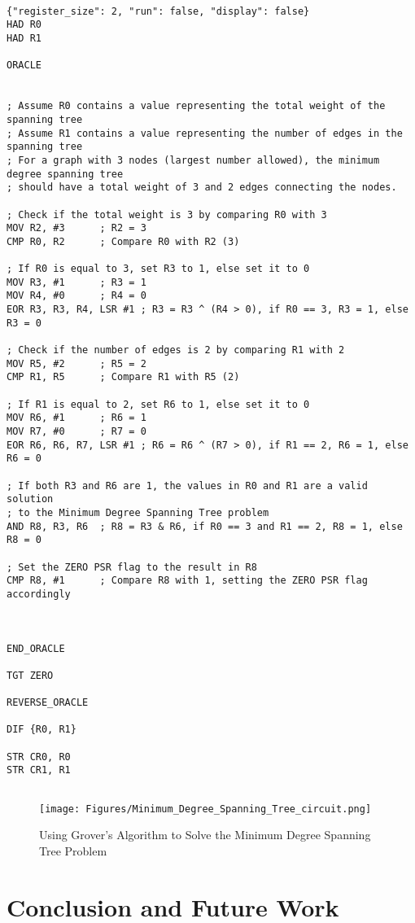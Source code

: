 \begin{lstlisting}

{"register_size": 2, "run": false, "display": false}
HAD R0
HAD R1

ORACLE


; Assume R0 contains a value representing the total weight of the spanning tree
; Assume R1 contains a value representing the number of edges in the spanning tree
; For a graph with 3 nodes (largest number allowed), the minimum degree spanning tree
; should have a total weight of 3 and 2 edges connecting the nodes.

; Check if the total weight is 3 by comparing R0 with 3
MOV R2, #3      ; R2 = 3
CMP R0, R2      ; Compare R0 with R2 (3)

; If R0 is equal to 3, set R3 to 1, else set it to 0
MOV R3, #1      ; R3 = 1
MOV R4, #0      ; R4 = 0
EOR R3, R3, R4, LSR #1 ; R3 = R3 ^ (R4 > 0), if R0 == 3, R3 = 1, else R3 = 0

; Check if the number of edges is 2 by comparing R1 with 2
MOV R5, #2      ; R5 = 2
CMP R1, R5      ; Compare R1 with R5 (2)

; If R1 is equal to 2, set R6 to 1, else set it to 0
MOV R6, #1      ; R6 = 1
MOV R7, #0      ; R7 = 0
EOR R6, R6, R7, LSR #1 ; R6 = R6 ^ (R7 > 0), if R1 == 2, R6 = 1, else R6 = 0

; If both R3 and R6 are 1, the values in R0 and R1 are a valid solution
; to the Minimum Degree Spanning Tree problem
AND R8, R3, R6  ; R8 = R3 & R6, if R0 == 3 and R1 == 2, R8 = 1, else R8 = 0

; Set the ZERO PSR flag to the result in R8
CMP R8, #1      ; Compare R8 with 1, setting the ZERO PSR flag accordingly



END_ORACLE

TGT ZERO

REVERSE_ORACLE

DIF {R0, R1}

STR CR0, R0
STR CR1, R1


\end{lstlisting}

\begin{figure}[htp]
    \centering
    \texttt{[image: Figures/Minimum\_Degree\_Spanning\_Tree\_circuit.png]}
    \caption{Using Grover's Algorithm to Solve the Minimum Degree Spanning Tree Problem}
    \label{fig:Minimum_Degree_Spanning_Tree}
\end{figure}

\section{Conclusion and Future Work}
\label{sec:conclusion}

